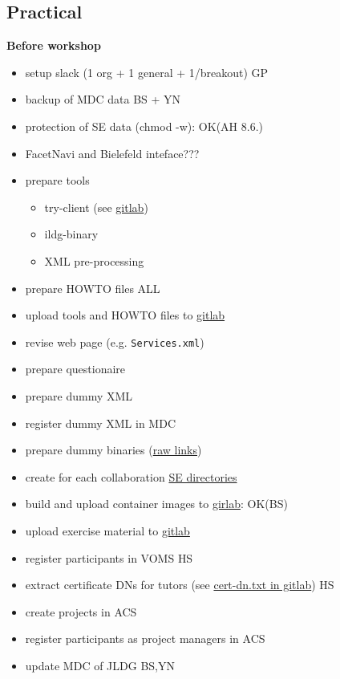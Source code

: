 \documentclass{article}
\begin{document}
\subsection{Practical}
{\bf Before workshop}
\begin{itemize}
    \item setup slack (1 org + 1 general + 1/breakout) \hfill{GP}
    \item backup of MDC data \hfill{BS + YN}
    \item protection of SE data (chmod -w): OK(AH 8.6.)
    \item FacetNavi and Bielefeld inteface???
    \item prepare tools
    \begin{itemize}
        \item try-client (see \href{https://gitlab.desy.de/ildg/hands-on/try-client}{gitlab})
        \item ildg-binary
        \item XML pre-processing
    \end{itemize}
    \item prepare HOWTO files \hfill ALL
    \item upload tools and HOWTO files to \href{https://gitlab.desy.de/ildg/hands-on/material}{gitlab}
    \item revise web page (e.g. {\tt Services.xml})
    \item prepare questionaire
    \item prepare dummy XML
    \item register dummy XML in MDC
    \item prepare dummy binaries (\href{srm://globe-door.ifh.de/pnfs/ifh.de/acs/grid/ildg/hands-on/test/hubert}{raw links})
    \item create for each collaboration \href{srm://globe-door.ifh.de/pnfs/ifh.de/acs/grid/ildg/hands-on}{SE directories}
    \item build and upload container images to \href{https://gitlab.desy.de/ildg/hands-on/workshop-image}{girlab}: OK(BS)
    \item upload exercise material to \href{https://gitlab.desy.de/ildg/hands-on/material}{gitlab}
    \item register participants in VOMS \hfill{HS}
    \item extract certificate DNs for tutors 
    (see \href{https://gitlab.desy.de/ildg/hands-on/material}{cert-dn.txt in gitlab})     \hfill{HS}
    \item create projects in ACS
    \item register participants as project managers in ACS
    \item update MDC of JLDG \hfill{BS,YN}
\end{itemize}
\end{document}
